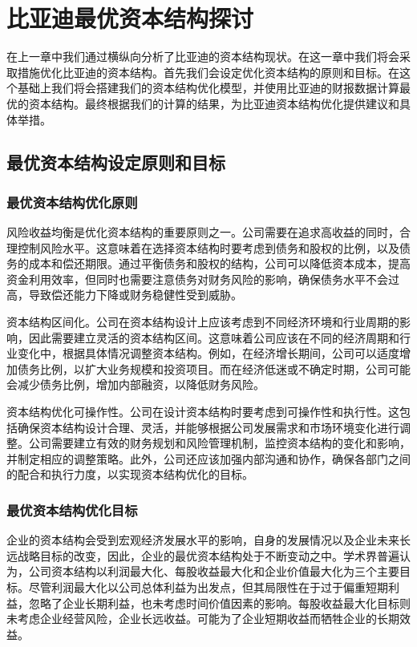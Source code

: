\chapter{比亚迪最优资本结构探讨}
在上一章中我们通过横纵向分析了比亚迪的资本结构现状。在这一章中我们将会采取措施优化比亚迪的资本结构。首先我们会设定优化资本结构的原则和目标。在这个基础上我们将会搭建我们的资本结构优化模型，并使用比亚迪的财报数据计算最优的资本结构。最终根据我们的计算的结果，为比亚迪资本结构优化提供建议和具体举措。
\section{最优资本结构设定原则和目标}
\subsection{最优资本结构优化原则}
风险收益均衡是优化资本结构的重要原则之一。公司需要在追求高收益的同时，合理控制风险水平。这意味着在选择资本结构时要考虑到债务和股权的比例，以及债务的成本和偿还期限。通过平衡债务和股权的结构，公司可以降低资本成本，提高资金利用效率，但同时也需要注意债务对财务风险的影响，确保债务水平不会过高，导致偿还能力下降或财务稳健性受到威胁。

资本结构区间化。公司在资本结构设计上应该考虑到不同经济环境和行业周期的影响，因此需要建立灵活的资本结构区间。这意味着公司应该在不同的经济周期和行业变化中，根据具体情况调整资本结构。例如，在经济增长期间，公司可以适度增加债务比例，以扩大业务规模和投资项目。而在经济低迷或不确定时期，公司可能会减少债务比例，增加内部融资，以降低财务风险。

资本结构优化可操作性。公司在设计资本结构时要考虑到可操作性和执行性。这包括确保资本结构设计合理、灵活，并能够根据公司发展需求和市场环境变化进行调整。公司需要建立有效的财务规划和风险管理机制，监控资本结构的变化和影响，并制定相应的调整策略。此外，公司还应该加强内部沟通和协作，确保各部门之间的配合和执行力度，以实现资本结构优化的目标。
\subsection{最优资本结构优化目标}
企业的资本结构会受到宏观经济发展水平的影响，自身的发展情况以及企业未来长远战略目标的改变，因此，企业的最优资本结构处于不断变动之中。学术界普遍认为，公司资本结构以利润最大化、每股收益最大化和企业价值最大化为三个主要目标。尽管利润最大化以公司总体利益为出发点，但其局限性在于过于偏重短期利益，忽略了企业长期利益，也未考虑时间价值因素的影响。每股收益最大化目标则未考虑企业经营风险，企业长远收益。可能为了企业短期收益而牺牲企业的长期效益。

